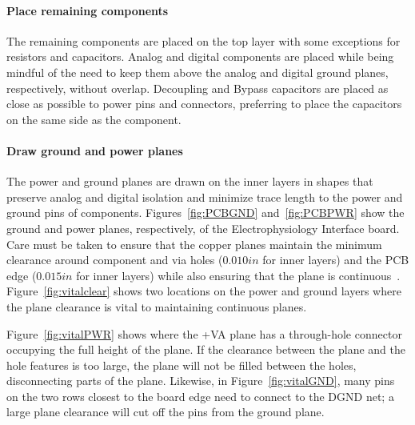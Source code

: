 \paragraph{Place remaining components}

The remaining components are placed on the top layer with some exceptions for resistors and capacitors.  Analog and digital components are placed while being mindful of the need to keep them above the analog and digital ground planes, respectively, without overlap.  Decoupling and Bypass capacitors are placed as close as possible to power pins and connectors, preferring to place the capacitors on the same side as the component.

\paragraph{Draw ground and power planes}

The power and ground planes are drawn on the inner layers in shapes that preserve analog and digital isolation and minimize trace length to the power and ground pins of components.  Figures~\ref{fig:PCBGND} and~\ref{fig:PCBPWR} show the ground and power planes, respectively, of the Electrophysiology Interface board.  Care must be taken to ensure that the copper planes maintain the minimum clearance around component and via holes ($0.010\unit{in}$ for inner layers) and the PCB edge ($0.015\unit{in}$ for inner layers) while also ensuring that the plane is continuous~\cite{AdvCirTol}.  Figure~\ref{fig:vitalclear} shows two locations on the power and ground layers where the plane clearance is vital to maintaining continuous planes.

Figure~\ref{fig:vitalPWR} shows where the +VA plane has a through-hole connector occupying the full height of the plane.  If the clearance between the plane and the hole features is too large, the plane will not be filled between the holes, disconnecting parts of the plane.  Likewise, in Figure~\ref{fig:vitalGND}, many pins on the two rows closest to the board edge need to connect to the DGND net; a large plane clearance will cut off the pins from the ground plane.

